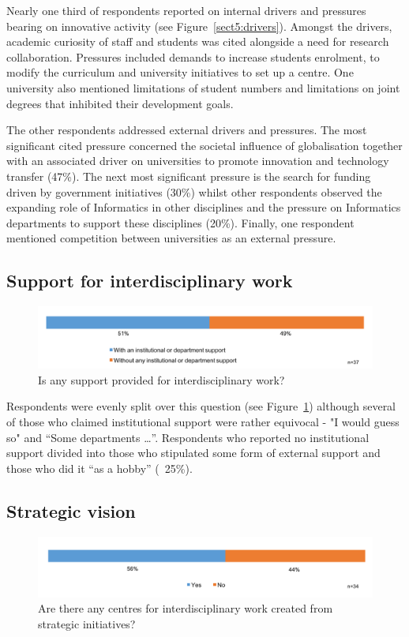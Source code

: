 Nearly one third of respondents reported on internal drivers and pressures bearing on innovative activity (see Figure~\ref{sect5:drivers}). Amongst the drivers, academic curiosity of staff and students was cited alongside a need for research collaboration. Pressures included demands to increase students enrolment, to modify the curriculum and university initiatives to set up a centre. One university also mentioned limitations of student numbers and limitations on joint degrees that inhibited their development goals.

The other respondents addressed external drivers and pressures. The most significant cited pressure concerned the societal influence of globalisation together with an associated driver on universities to promote innovation and  technology transfer (47\%).  The next most significant pressure is the search for funding driven by government initiatives (30\%) whilst other respondents observed the expanding role of Informatics in other disciplines and the pressure on Informatics departments to support these disciplines (20\%). Finally, one respondent mentioned competition between universities as an external pressure.

\subsection{Support for interdisciplinary work}

\begin{figure}[h]
\centering
\includegraphics[width = \linewidth]{charts/5h.png}
\caption{Is any support provided for interdisciplinary work?}
\label{sect5:support}
\end{figure}

Respondents were evenly split over this question (see Figure~\ref{sect5:support}) although several of those who claimed institutional support were rather equivocal - "I would guess so" and ``Some departments \ldots ''. Respondents who reported no institutional support divided into those who stipulated some form of external support and those who did it ``as a hobby'' (~25\%).

\subsection{Strategic vision }
\begin{figure}[h]
\centering
\includegraphics[width = \linewidth]{charts/5i.png}
\caption{Are there any centres for interdisciplinary work created from strategic initiatives?}
\label{sect5:strategy}
\end{figure}

